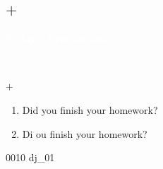 \documentclass[aspectratio=169,xcolor={dvipsnames,table}]{beamer}
\begin{document}
\subsection{ $+$ }
\begin{frame}
  \hypertarget{today}{}
  \centering
  \textcolor{white}{\Huge\bfseries Today's Pronunciation}

  \vspace{30pt}


  \textcolor{white}{\Large {} $+$ }
\end{frame}
\begin{frame}[plain]{ $+$ }
  \Large

  \begin{enumerate}
    \item<1->  Did you finish your homework?
    \item<2-> Di  ou finish your homework?
  \end{enumerate}
  \bigskip




  \hfill{}

  \hfill{\tiny 0010}\,{\scriptsize {}\,dj\_01}

\end{frame}
\end{document}

